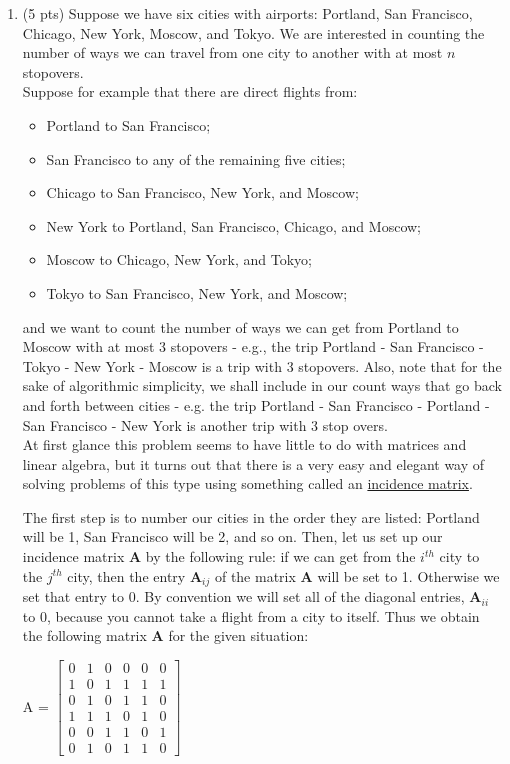\documentclass[11pt,a4paper,oneside]{report}
\begin{document}
\begin{enumerate}
\item (5 pts) Suppose we have six cities with airports: Portland, San Francisco, Chicago, New York, Moscow, and Tokyo. We are interested in counting the number of ways we can travel from one city to another with at most $n$ stopovers. \\

Suppose for example that there are direct flights from:
\begin{itemize}
\item Portland to San Francisco;
\item San Francisco to any of the remaining five cities;
\item Chicago to San Francisco, New York, and Moscow;
\item New York to Portland, San Francisco, Chicago, and Moscow;
\item Moscow to Chicago, New York, and Tokyo;
\item Tokyo to San Francisco, New York, and Moscow;
\end{itemize}
and we want to count the number of ways we can get from Portland to Moscow with at most 3 stopovers - e.g., the trip Portland - San Francisco - Tokyo - New York - Moscow is a trip with 3 stopovers. Also, note that for the sake of algorithmic simplicity, we shall include in our count ways that go back and forth between cities - e.g. the trip Portland - San Francisco - Portland - San Francisco - New York is another trip with 3 stop overs.\\

At first glance this problem seems to have little to do with matrices and linear algebra, but it turns out that there is a very easy and elegant way of solving problems of this type using something called an \href{https://en.wikipedia.org/wiki/Incidence_matrix}{incidence matrix}.

The first step is to number our cities in the order they are listed: Portland will be 1, San Francisco will be 2, and so on.  Then, let us set up our incidence matrix {\bf A} by the following rule: if we can get from the $i^{th}$ city to the $j^{th}$ city, then the entry {\bf A}$_{ij}$ of the matrix {\bf A} will be set to 1.  Otherwise we set that entry to 0.  By convention we will set all of the diagonal entries, {\bf A}$_{ii}$ to 0, because you cannot take a flight from a city to itself.  Thus we obtain the following matrix {\bf A} for the given situation:

A = 
$\begin{bmatrix}
0 & 1 & 0 & 0 & 0 & 0 \\
1 & 0 & 1 & 1 & 1 & 1 \\
0 & 1 & 0 & 1 & 1 & 0 \\
1 & 1 & 1 & 0 & 1 & 0 \\
0 & 0 & 1 & 1 & 0 & 1 \\
0 & 1 & 0 & 1 & 1 & 0 
\end{bmatrix}$


\end{enumerate}
\end{document}
